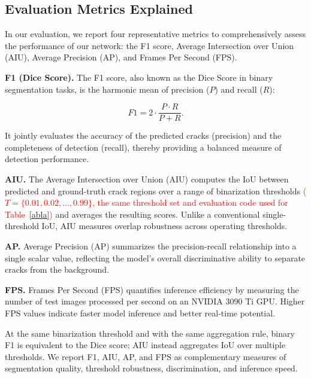 \documentclass[journal]{IEEEtran}
\begin{document}
\subsection{Evaluation Metrics Explained}


In our evaluation, we report four representative metrics to comprehensively assess the performance of our network: 
the F1 score, Average Intersection over Union (AIU), Average Precision (AP), and Frames Per Second (FPS).



\textbf{F1 (Dice Score).} 
The F1 score, also known as the Dice Score in binary segmentation tasks, is the harmonic mean of precision ($P$) and recall ($R$):


\begin{equation}
F1 = 2 \cdot \frac{P \cdot R}{P + R}.
\end{equation}



It jointly evaluates the accuracy of the predicted cracks (precision) and the completeness of detection (recall), 
thereby providing a balanced measure of detection performance.



\textbf{AIU.}
The Average Intersection over Union (AIU) computes the IoU between predicted and ground-truth crack regions over a range of binarization thresholds \textcolor{red}{($T=\{0.01, 0.02, \ldots, 0.99\}$, the same threshold set and evaluation code used for Table~\ref{abla})} and averages the resulting scores. Unlike a conventional single-threshold IoU, AIU measures overlap robustness across operating thresholds.



\textbf{AP.}
Average Precision (AP) summarizes the precision-recall relationship into a single scalar value, 
reflecting the model’s overall discriminative ability to separate cracks from the background.



\textbf{FPS.}
Frames Per Second (FPS) quantifies inference efficiency by measuring the number of test images processed per second on an NVIDIA 3090 Ti GPU. 
Higher FPS values indicate faster model inference and better real-time potential.



At the same binarization threshold and with the same aggregation rule, binary F1 is equivalent to the Dice score; AIU instead aggregates IoU over multiple thresholds. We report F1, AIU, AP, and FPS as complementary measures of segmentation quality, threshold robustness, discrimination, and inference speed.
\end{document}
